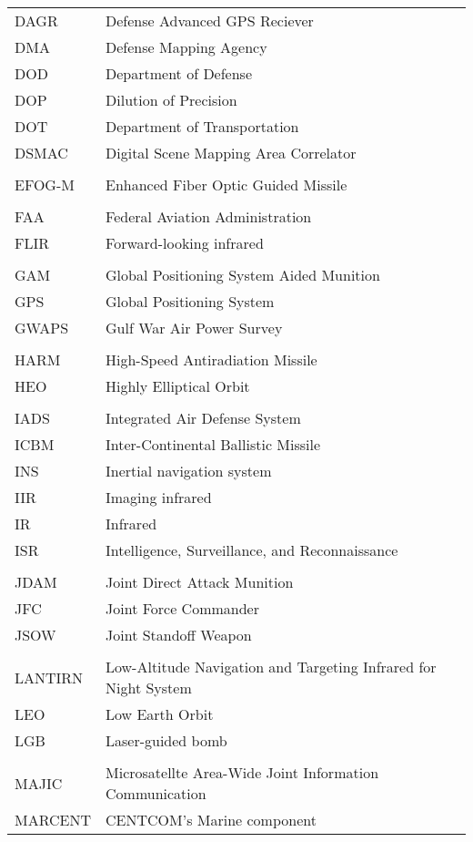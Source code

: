 \begin{supertabular}{ll}
\\
DAGR & Defense Advanced GPS Reciever \\
DMA & Defense Mapping Agency \\
DOD & Department of Defense \\
DOP & Dilution of Precision \\
DOT & Department of Transportation \\
DSMAC & Digital Scene Mapping Area Correlator \\
\\
EFOG-M & Enhanced Fiber Optic Guided Missile \\
\\
FAA & Federal Aviation Administration \\
FLIR & Forward-looking infrared \\
\\
GAM & Global Positioning System Aided Munition \\
GPS & Global Positioning System \\
GWAPS & Gulf War Air Power Survey \\
\\
HARM & High-Speed Antiradiation Missile \\
HEO & Highly Elliptical Orbit \\
\\
IADS & Integrated Air Defense System \\
ICBM & Inter-Continental Ballistic Missile \\
INS & Inertial navigation system \\
IIR & Imaging infrared \\
IR & Infrared \\
ISR & Intelligence, Surveillance, and Reconnaissance \\
\\
JDAM & Joint Direct Attack Munition \\
JFC & Joint Force Commander \\
JSOW & Joint Standoff Weapon \\
\\
LANTIRN & Low-Altitude Navigation and Targeting Infrared for Night System \\
LEO & Low Earth Orbit \\
LGB & Laser-guided bomb \\
\\
MAJIC & Microsatellte Area-Wide Joint Information Communication \\
MARCENT & CENTCOM's Marine component \\

\end{supertabular}

